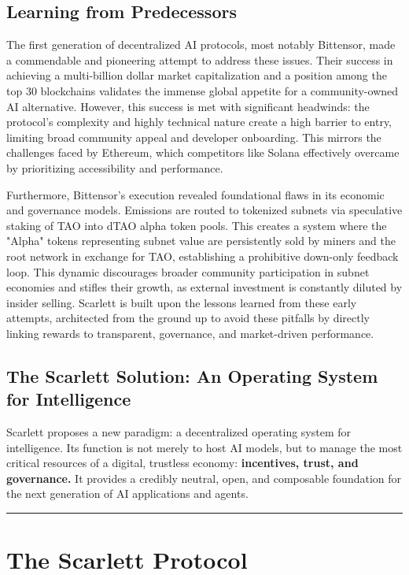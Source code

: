 \documentclass[10pt]{article}
\begin{document}
\subsection{Learning from Predecessors}
The first generation of decentralized AI protocols, most notably Bittensor, made a commendable and pioneering attempt to address these issues. Their success in achieving a multi-billion dollar market capitalization and a position among the top 30 blockchains validates the immense global appetite for a community-owned AI alternative. However, this success is met with significant headwinds: the protocol's complexity and highly technical nature create a high barrier to entry, limiting broad community appeal and developer onboarding. This mirrors the challenges faced by Ethereum, which competitors like Solana effectively overcame by prioritizing accessibility and performance.

Furthermore, Bittensor's execution revealed foundational flaws in its economic and governance models. Emissions are routed to tokenized subnets via speculative staking of TAO into dTAO alpha token pools. This creates a system where the "Alpha" tokens representing subnet value are persistently sold by miners and the root network in exchange for TAO, establishing a prohibitive down-only feedback loop. This dynamic discourages broader community participation in subnet economies and stifles their growth, as external investment is constantly diluted by insider selling. Scarlett is built upon the lessons learned from these early attempts, architected from the ground up to avoid these pitfalls by directly linking rewards to transparent, governance, and market-driven performance.

\subsection{The Scarlett Solution: An Operating System for Intelligence}
Scarlett proposes a new paradigm: a decentralized operating system for intelligence. Its function is not merely to host AI models, but to manage the most critical resources of a digital, trustless economy: \textbf{incentives, trust, and governance.} It provides a credibly neutral, open, and composable foundation for the next generation of AI applications and agents.

\hrule
\vspace{1em}
\section{The Scarlett Protocol}
\end{document}
